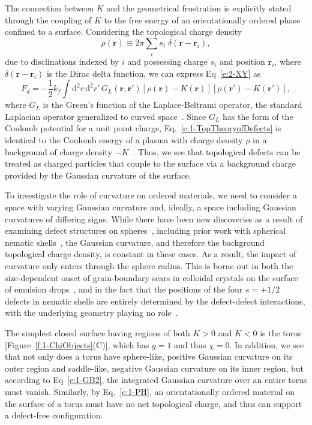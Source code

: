 The connection between $K$ and the geometrical frustration is explicitly stated through the coupling of $K$ to the free energy of an orientationally ordered phase confined to a surface.
Considering the topological charge density
\begin{equation}
  \rho(\mathbf{r}) \equiv 2 \pi \sum\limits_i s_{i} \; \delta(\mathbf{r} - \mathbf{r}_{i}),\label{e:1-ChargeDens}
\end{equation}
due to disclinations indexed by $i$ and possessing charge $s_{i}$ and position $\mathbf{r}_{i}$, where $\delta(\mathbf{r} - \mathbf{r}_{i})$ is the Dirac delta function, we can express Eq~\ref{e:2-XY} as~\cite{RN42,RN175,RN17}
\begin{equation}
  F_d = -\frac{1}{2} k_f \int \textrm{d}^2 r \, \textrm{d}^2 r' \, G_L(\mathbf{r},\mathbf{r}') [\rho(\mathbf{r})-K(\mathbf{r})] [\rho(\mathbf{r}')-K(\mathbf{r}')],\label{e:1-TopTheoryofDefects}
\end{equation}
where $G_L$ is the Green's function of the Laplace-Beltrami operator, the standard Laplacian operator generalized to curved space~\cite{RN17}.
Since $G_L$ has the form of the Coulomb potential for a unit point charge, Eq.~\ref{e:1-TopTheoryofDefects} is identical to the Coulomb energy of a plasma with charge density $\rho$ in a background of charge density $-K$~\cite{RN17}.
Thus, we see that topological defects can be treated as charged particles that couple to the surface via a background charge provided by the Gaussian curvature of the surface.

To investigate the role of curvature on ordered materials, we need to consider a space with varying Gaussian curvature and, ideally, a space including Gaussian curvatures of differing signs.
While there have been new discoveries as a result of examining defect structures on spheres~\cite{RN106,RN26,RN110,RN76,RN101,RN165}, including prior work with spherical nematic shells~\cite{RN45,RN105}, the Gaussian curvature, and therefore the background topological charge density, is constant in these cases.
As a result, the impact of curvature only enters through the sphere radius.
This is borne out in both the size-dependent onset of grain-boundary scars in colloidal crystals on the surface of emulsion drops~\cite{RN26,RN110}, and in the fact that the positions of the four $s = +1/2$ defects in nematic shells are entirely determined by the defect-defect interactions, with the underlying geometry playing no role~\cite{RN45}.

The simplest closed surface having regions of both $K>0$ and $K<0$ is the torus [Figure~\ref{f:1-ChiObjects}(C)], which has $g = 1$ and thus $\chi = 0$.
In addition, we see that not only does a torus have sphere-like, positive Gaussian curvature on its outer region and saddle-like, negative Gaussian curvature on its inner region, but according to Eq~\ref{e:1-GB2}, the integrated Gaussian curvature over an entire torus must vanish.
Similarly, by Eq.~\ref{e:1-PH}, an orientationally ordered material on the surface of a torus must have no net topological charge, and thus can support a defect-free configuration.

